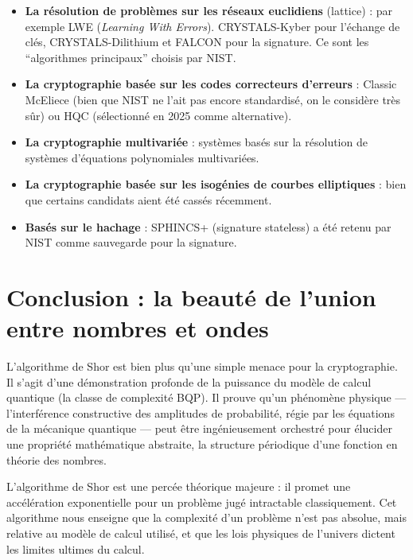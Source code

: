 \documentclass[11pt,a4paper]{article}
\begin{document}
\begin{itemize}
\item \textbf{La résolution de problèmes sur les réseaux euclidiens} (lattice) : par exemple LWE (\textit{Learning With Errors}). CRYSTALS-Kyber pour l'échange de clés, CRYSTALS-Dilithium et FALCON pour la signature. Ce sont les ``algorithmes principaux'' choisis par NIST.

\item \textbf{La cryptographie basée sur les codes correcteurs d'erreurs} : Classic McEliece (bien que NIST ne l'ait pas encore standardisé, on le considère très sûr) ou HQC (sélectionné en 2025 comme alternative).

\item \textbf{La cryptographie multivariée} : systèmes basés sur la résolution de systèmes d'équations polynomiales multivariées.

\item \textbf{La cryptographie basée sur les isogénies de courbes elliptiques} : bien que certains candidats aient été cassés récemment.

\item \textbf{Basés sur le hachage} : SPHINCS+ (signature stateless) a été retenu par NIST comme sauvegarde pour la signature.
\end{itemize}

\section{Conclusion : la beauté de l'union entre nombres et ondes}

L'algorithme de Shor est bien plus qu'une simple menace pour la cryptographie. Il s'agit d'une démonstration profonde de la puissance du modèle de calcul quantique (la classe de complexité BQP). Il prouve qu'un phénomène physique — l'interférence constructive des amplitudes de probabilité, régie par les équations de la mécanique quantique — peut être ingénieusement orchestré pour élucider une propriété mathématique abstraite, la structure périodique d'une fonction en théorie des nombres.

L'algorithme de Shor est une percée théorique majeure : il promet une accélération exponentielle pour un problème jugé intractable classiquement. Cet algorithme nous enseigne que la complexité d'un problème n'est pas absolue, mais relative au modèle de calcul utilisé, et que les lois physiques de l'univers dictent les limites ultimes du calcul. 
\end{document}
